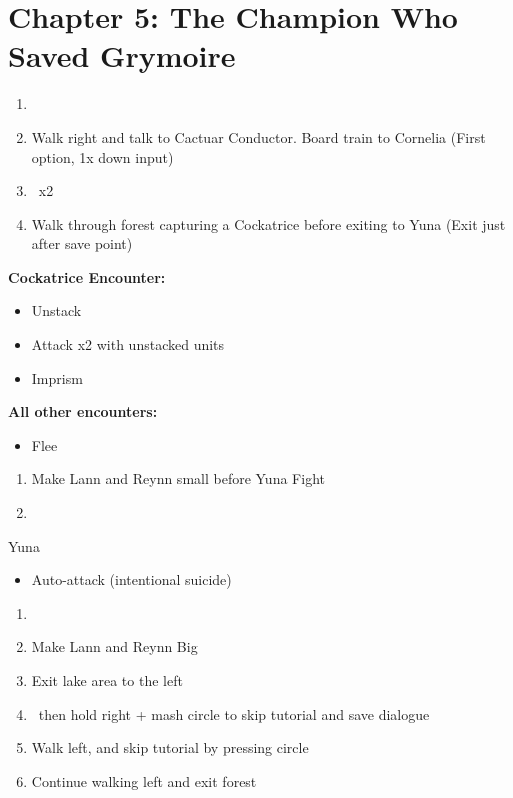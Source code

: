 \chapter{Chapter 5: The Champion Who Saved Grymoire}
\begin{enumerate}
	\item \cs
	\item Walk right and talk to Cactuar Conductor. Board train to Cornelia (First option, 1x down input)
	\item \cs\ x2
	\item Walk through forest capturing a Cockatrice before exiting to Yuna (Exit just after save point)
\end{enumerate}
\begin{encounters}
\textbf{Cockatrice Encounter:}
	\begin{itemize}
		\item Unstack
		\item Attack x2 with unstacked units
		\item Imprism
	\end{itemize}
\textbf{All other encounters:}
	\begin{itemize}
		\item Flee
	\end{itemize}
\end{encounters}
\begin{enumerate}[resume]
	\item Make Lann and Reynn small before Yuna Fight
	\item \cs
\end{enumerate}
\begin{battle}[]{Yuna}
	\begin{itemize}
		\item Auto-attack (intentional suicide)
	\end{itemize}
\end{battle}
\begin{enumerate}[resume]
	\item \cs
	\item Make Lann and Reynn Big
	\item Exit lake area to the left
	\item \cs\ then hold right + mash circle to skip tutorial and save dialogue
	\item Walk left,  and skip tutorial by pressing circle
	\item Continue walking left and exit forest
\end{enumerate}